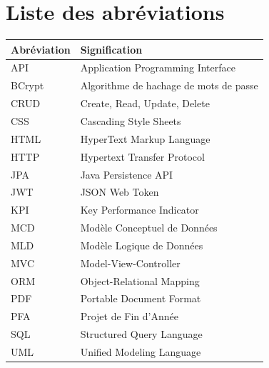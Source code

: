 \chapter*{Liste des abréviations}

\begin{tabular}{@{}ll@{}}
    \toprule
    \textbf{Abréviation} & \textbf{Signification} \\
    \midrule
    API     & Application Programming Interface \\
    BCrypt  & Algorithme de hachage de mots de passe \\
    CRUD    & Create, Read, Update, Delete \\
    CSS     & Cascading Style Sheets \\
    HTML    & HyperText Markup Language \\
    HTTP    & Hypertext Transfer Protocol \\
    JPA     & Java Persistence API \\
    JWT     & JSON Web Token \\
    KPI     & Key Performance Indicator \\
    MCD     & Modèle Conceptuel de Données \\
    MLD     & Modèle Logique de Données \\
    MVC     & Model-View-Controller \\
    ORM     & Object-Relational Mapping \\
    PDF     & Portable Document Format \\
    PFA     & Projet de Fin d'Année \\
    SQL     & Structured Query Language \\
    UML     & Unified Modeling Language \\
    \bottomrule
\end{tabular}
